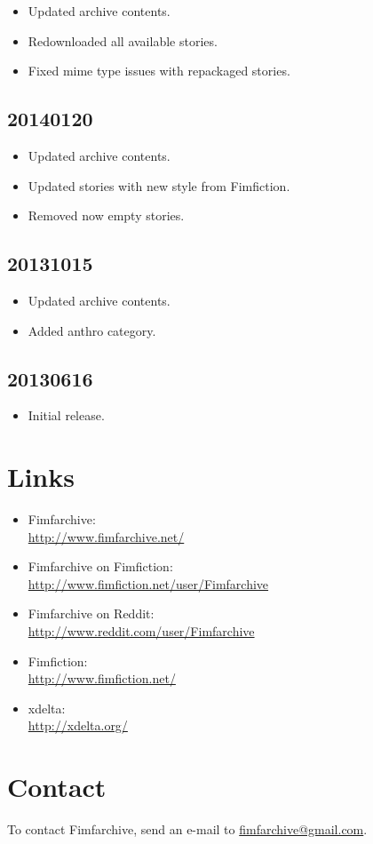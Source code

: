 \documentclass[hidelinks,a4paper,12pt]{article}
\begin{document}
\begin{itemize}
\item Updated archive contents.
\item Redownloaded all available stories.
\item Fixed mime type issues with repackaged stories.
\end{itemize}

\subsection{20140120} \label{sec:changelog_20140120}

\begin{itemize}
\item Updated archive contents.
\item Updated stories with new style from Fimfiction.
\item Removed now empty stories.
\end{itemize}

\subsection{20131015} \label{sec:changelog_20131015}

\begin{itemize}
\item Updated archive contents.
\item Added anthro category.
\end{itemize}

\subsection{20130616} \label{sec:changelog_20130616}

\begin{itemize}
\item Initial release.
\end{itemize}


\section{Links} \label{sec:links}

\begin{itemize}
\item Fimfarchive: \\ \url{http://www.fimfarchive.net/}
\item Fimfarchive on Fimfiction: \\ \url{http://www.fimfiction.net/user/Fimfarchive}
\item Fimfarchive on Reddit: \\ \url{http://www.reddit.com/user/Fimfarchive}
\item Fimfiction: \\ \url{http://www.fimfiction.net/}
\item xdelta: \\ \url{http://xdelta.org/}
\end{itemize}


\section{Contact} \label{sec:contact}

To contact Fimfarchive, send an e-mail to \href{mailto:fimfarchive@gmail.com}{fimfarchive@gmail.com}.
\end{document}
